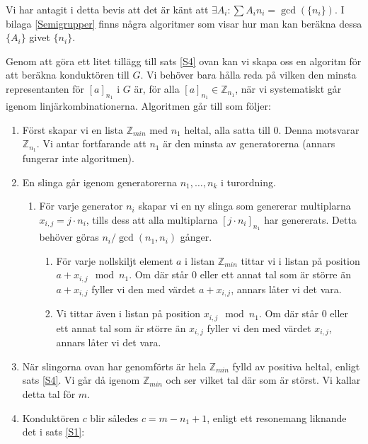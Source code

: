 Vi har antagit i detta bevis att det är känt att $\exists A_i : \sum A_i n_i = \gcd(\{n_i\})$. I bilaga \ref{Semigrupper} finns några algoritmer som visar hur man kan beräkna dessa $\{A_i\}$ givet $\{n_i\}$.

Genom att göra ett litet tillägg till sats \ref{S4} ovan kan vi skapa oss en algoritm för att beräkna konduktören till $G$. Vi behöver bara hålla reda på vilken den minsta representanten för $[a]_{n_1}$ i $G$ är, för alla $[a]_{n_1} \in \mathbb{Z}_{n_1}$, när vi systematiskt går igenom linjärkombinationerna. Algoritmen går till som följer:

\begin{enumerate}
\item Först skapar vi en lista $\mathbb{Z}_{min}$ med $n_1$ heltal, alla satta till $0$. Denna motsvarar $\mathbb{Z}_{n_1}$. Vi antar fortfarande att $n_1$ är den minsta av generatorerna (annars fungerar inte algoritmen).

\item En slinga går igenom generatorerna $n_1, \ldots, n_k$ i turordning.

\begin{enumerate}
\item För varje generator $n_i$ skapar vi en ny slinga som genererar multiplarna $x_{i,j} = j \cdot n_i$, tills dess att alla multiplarna $[j \cdot n_i]_{n_1}$ har genererats. Detta behöver göras $n_i/\gcd(n_1, n_i)$ gånger.

\begin{enumerate}
\item För varje nollskiljt element $a$ i listan $\mathbb{Z}_{min}$ tittar vi i listan på position $a + x_{i,j} \mod{n_1}$. Om där står $0$ eller ett annat tal som är större än $a + x_{i,j}$ fyller vi den med värdet $a + x_{i,j}$, annars låter vi det vara.

\item Vi tittar även i listan på position $x_{i,j} \mod{n_1}$. Om där står $0$ eller ett annat tal som är större än $x_{i,j}$ fyller vi den med värdet $x_{i,j}$, annars låter vi det vara.
\end{enumerate}
\end{enumerate}

\item När slingorna ovan har genomförts är hela $\mathbb{Z}_{min}$ fylld av positiva heltal, enligt sats \ref{S4}. Vi går då igenom $\mathbb{Z}_{min}$ och ser vilket tal där som är störst. Vi kallar detta tal för $m$.

\item Konduktören $c$ blir således $c = m - n_1 + 1$, enligt ett resonemang liknande det i sats \ref{S1}:


\end{enumerate}
